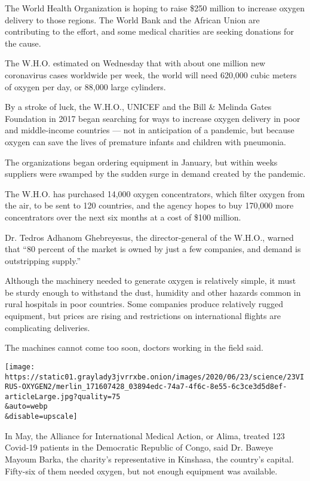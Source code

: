 The World Health Organization is hoping to raise \$250 million to
increase oxygen delivery to those regions. The World Bank and the
African Union are contributing to the effort, and some medical charities
are seeking donations for the cause.

The W.H.O. estimated on Wednesday that with about one million new
coronavirus cases worldwide per week, the world will need 620,000 cubic
meters of oxygen per day, or 88,000 large cylinders.

By a stroke of luck, the W.H.O., UNICEF and the Bill \& Melinda Gates
Foundation in 2017 began searching for ways to increase oxygen delivery
in poor and middle-income countries --- not in anticipation of a
pandemic, but because oxygen can save the lives of premature infants and
children with pneumonia.

The organizations began ordering equipment in January, but within weeks
suppliers were swamped by the sudden surge in demand created by the
pandemic.

The W.H.O. has purchased 14,000 oxygen concentrators, which filter
oxygen from the air, to be sent to 120 countries, and the agency hopes
to buy 170,000 more concentrators over the next six months at a cost of
\$100 million.

Dr. Tedros Adhanom Ghebreyesus, the director-general of the W.H.O.,
warned that ``80 percent of the market is owned by just a few companies,
and demand is outstripping supply.''

Although the machinery needed to generate oxygen is relatively simple,
it must be sturdy enough to withstand the dust, humidity and other
hazards common in rural hospitals in poor countries. Some companies
produce relatively rugged equipment, but prices are rising and
restrictions on international flights are complicating deliveries.

The machines cannot come too soon, doctors working in the field said.

\texttt{[image: https://static01.graylady3jvrrxbe.onion/images/2020/06/23/science/23VIRUS-OXYGEN2/merlin\_171607428\_03894edc-74a7-4f6c-8e55-6c3ce3d5d8ef-articleLarge.jpg?quality=75\\\&auto=webp\\\&disable=upscale]}

In May, the Alliance for International Medical Action, or Alima, treated
123 Covid-19 patients in the Democratic Republic of Congo, said Dr.
Baweye Mayoum Barka, the charity's representative in Kinshasa, the
country's capital. Fifty-six of them needed oxygen, but not enough
equipment was available.

